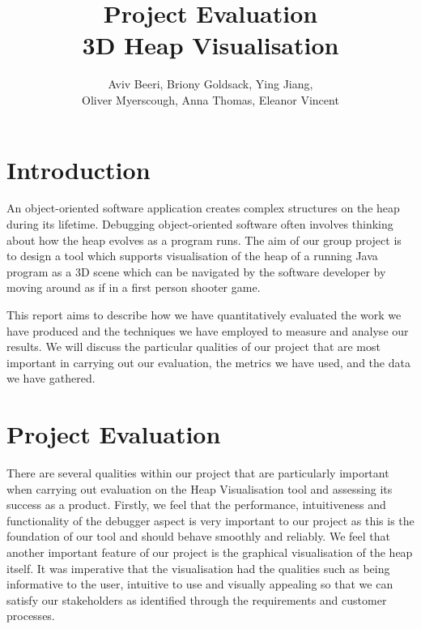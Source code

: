 \documentclass[10pt, a4paper]{article}
\begin{document}
\title{Project Evaluation
\\ 3D Heap Visualisation}
\author{Aviv Beeri, Briony Goldsack, Ying Jiang, 
\\ Oliver Myerscough, Anna Thomas, Eleanor Vincent}
\maketitle


\section{Introduction}

An object-oriented software application creates complex structures on the heap during its lifetime. Debugging object-oriented software often involves thinking about how the heap evolves as a program runs. The aim of our group project is to design a tool which supports visualisation of the heap of a running Java program as a 3D scene which can be navigated by the software developer by moving around as if in a first person shooter game.

This report aims to describe how we have quantitatively evaluated the work we have produced and the techniques we have employed to measure and analyse our results. We will discuss the particular qualities of our project that are most important in carrying out our evaluation, the metrics we have used, and the data we have gathered. 

\section{Project Evaluation}

There are several qualities within our project that are particularly important when carrying out evaluation on the Heap Visualisation tool and assessing its success as a product. Firstly, we feel that the performance, intuitiveness and functionality of the debugger aspect is very important to our project as this is the foundation of our tool and should behave smoothly and reliably. We feel that another important feature of our project is the graphical visualisation of the heap itself. It was imperative that the visualisation had the qualities such as being informative to the user, intuitive to use and visually appealing so that we can satisfy our stakeholders as identified through the requirements and customer processes. 
\end{document}
